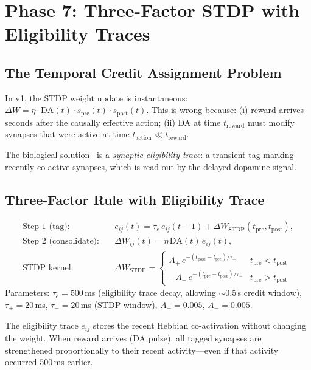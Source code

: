\documentclass[11pt,a4paper]{article}
\begin{document}
\section{Phase 7: Three-Factor STDP with Eligibility Traces}\label{sec:phase7}

\subsection{The Temporal Credit Assignment Problem}

In v1, the STDP weight update is instantaneous:
$\Delta W = \eta \cdot \text{DA}(t) \cdot s_\text{pre}(t) \cdot s_\text{post}(t)$.
This is wrong because: (i) reward arrives seconds after the causally effective
action; (ii) DA at time $t_\text{reward}$ must modify synapses that were active
at time $t_\text{action} \ll t_\text{reward}$.

The biological solution~\cite{fremaux2016} is a \emph{synaptic eligibility trace}:
a transient tag marking recently co-active synapses, which is read out
by the delayed dopamine signal.

\subsection{Three-Factor Rule with Eligibility Trace}

\begin{equation}\label{eq:three_factor}
\boxed{
\begin{aligned}
  \text{Step 1 (tag):}\quad &
  e_{ij}(t) = \tau_e\,e_{ij}(t{-}1) + \Delta W_\text{STDP}(t_\text{pre}, t_\text{post}), \\
  \text{Step 2 (consolidate):}\quad &
  \Delta W_{ij}(t) = \eta\,\text{DA}(t)\,e_{ij}(t), \\
  \text{STDP kernel:}\quad &
  \Delta W_\text{STDP} = \begin{cases}
    A_+\,e^{-(t_\text{post}-t_\text{pre})/\tau_+} & t_\text{pre} < t_\text{post} \\
    -A_-\,e^{-(t_\text{pre}-t_\text{post})/\tau_-} & t_\text{pre} > t_\text{post}
  \end{cases}
\end{aligned}
}
\end{equation}
Parameters: $\tau_e = 500$\,ms (eligibility trace decay, allowing $\sim$0.5\,s
credit window), $\tau_+ = 20$\,ms, $\tau_- = 20$\,ms (STDP window),
$A_+ = 0.005$, $A_- = 0.005$.

The eligibility trace $e_{ij}$ stores the recent Hebbian co-activation
without changing the weight.
When reward arrives (DA pulse), all tagged synapses are strengthened
proportionally to their recent activity---even if that activity occurred
500\,ms earlier.
\end{document}
